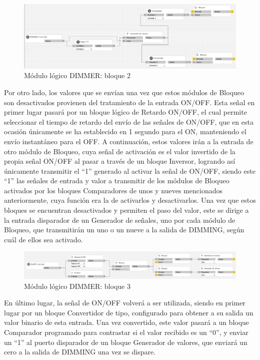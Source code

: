  \begin{center}
\begin{figure}[H]
\includegraphics[width=1.15\textwidth]{figures/log_dimm_b2.png}   
\caption{Módulo lógico DIMMER: bloque 2}
\label{fig:log_dimm_b2}
\end{figure}
\end{center}
Por otro lado, los valores que se envían una vez que estos módulos de Bloqueo son desactivados provienen del tratamiento de la entrada ON/OFF. Esta señal en primer lugar pasará por un bloque lógico de Retardo ON/OFF, el cual permite seleccionar el tiempo de retardo del envío de las señales de ON/OFF, que en esta ocasión únicamente se ha establecido en 1 segundo para el ON, manteniendo el envío instantáneo para el OFF. A continuación, estos valores irán a la entrada de otro módulo de Bloqueo, cuya señal de activación es el valor invertido de la propia señal ON/OFF al pasar a través de un bloque Inversor, logrando así únicamente transmitir el “1” generado al activar la señal de ON/OFF, siendo este “1” las señales de entrada y valor a transmitir de los módulos de Bloqueo activados por los bloques Comparadores de unos y nueves mencionados anteriormente, cuya función era la de activarlos y desactivarlos. Una vez que estos bloques se encuentran desactivados y permiten el paso del valor, este se dirige a la entrada disparador de un Generador de señales, uno por cada módulo de Bloqueo, que transmitirán un uno o un nueve a la salida de DIMMING, según cuál de ellos sea activado.
 \begin{center}
\begin{figure}[H]
\includegraphics[width=1.15\textwidth]{figures/log_dimm_b3.png}   
\caption{Módulo lógico DIMMER: bloque 3}
\label{fig:log_dimm_b3}
\end{figure}
\end{center}
En último lugar, la señal de ON/OFF volverá a ser utilizada, siendo en primer lugar por un bloque Convertidor de tipo, configurado para obtener a su salida un valor binario de esta entrada. Una vez convertido, este valor pasará a un bloque Comparador programado para  contrastar si el valor recibido es un “0”, y enviar un “1” al puerto disparador de un bloque Generador de valores, que enviará un cero a la salida de DIMMING una vez se dispare. 
